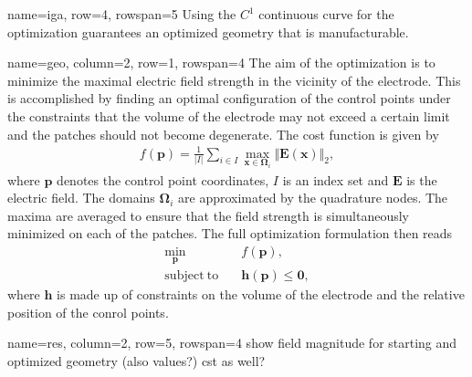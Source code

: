 \documentclass[
   accentcolor=9b,
   boxstyle=boxed
   ]{tudasciposter}
\begin{document}
\begin{tcbposter}[poster={columns=2, rows=8, spacing=1cm}]
\begin{posterboxenv}[title=Isogeometric Analysis]{name=iga, row=4, rowspan=5}
   Using the $C^1$ continuous curve for the optimization guarantees an optimized geometry that is manufacturable.

   \begin{center}
      
   \end{center}

\end{posterboxenv}

\begin{posterboxenv}[title=Geometry Optimization]{name=geo, column=2, row=1, rowspan=4}
   The aim of the optimization is to minimize the maximal electric field strength in the vicinity of the electrode. This is accomplished by finding an optimal configuration of the control points under the constraints that the volume of the electrode may not exceed a certain limit and the patches should not become degenerate.
   The cost function is given by
   \begin{align*}
      f(\mathbf{p}) = \frac{1}{|I|} \sum_{i \in I} \max_{\mathbf{x} \in \boldsymbol{\Omega}_i} \Vert \mathbf{E}(\mathbf{x}) \Vert_2,
   \end{align*}
   where $\mathbf{p}$ denotes the control point coordinates, $I$ is an index set and $\mathbf{E}$ is the electric field. The domains $\boldsymbol{\Omega}_i$ are approximated by the quadrature nodes. The maxima are averaged to ensure that the field strength is simultaneously minimized on each of the patches.
   The full optimization formulation then reads
   \begin{align*}
      \min_\mathbf{p}& \quad f(\mathbf{p}),\\
      \mathrm{subject\ to}& \quad \mathbf{h}(\mathbf{p}) \leq \mathbf{0},
   \end{align*}
   where $\mathbf{h}$ is made up of constraints on the volume of the electrode and the relative position of the conrol points.

   \begin{center}
      
   \end{center}
\end{posterboxenv}


\begin{posterboxenv}[title=Results]{name=res, column=2, row=5, rowspan=4}
   show field magnitude for starting and optimized geometry (also values?)
   cst as well?

   \begin{center}
      
   \end{center}

   \begin{center}
      
   \end{center}

\end{posterboxenv}

\end{tcbposter}
\end{document}
